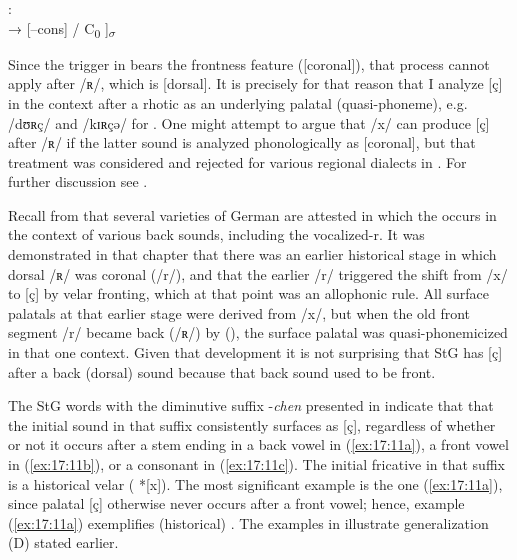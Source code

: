 \ea%
\label{ex:17:10}:\smallskip\\
 → [--cons] / {\longrule} C\textsubscript{0} ]\textsubscript{${\sigma}$}
\z 

Since the trigger  in  bears the frontness feature ([coronal]), that process cannot apply after /ʀ/, which is [dorsal]. It is precisely for that reason that I analyze [ç] in the context after a rhotic as an underlying palatal (quasi-phoneme), e.g. /dʊʀç/ and /kɪʀçə/ for . One might attempt to argue that /x/ can produce [ç] after /ʀ/ if the latter sound is analyzed phonologically as [coronal], but that treatment was considered and rejected for various regional dialects in . For further discussion see .

Recall from  that several varieties of German are attested in which the  occurs in the context of various back sounds, including the vocalized-r. It was demonstrated in that chapter that there was an earlier historical stage in which dorsal /ʀ/ was coronal (/r/), and that the earlier /r/ triggered the shift from /x/ to [ç] by velar fronting, which at that point was an allophonic rule. All surface palatals at that earlier stage were derived from /x/, but when the old front segment /r/ became back (/ʀ/) by  (), the surface palatal was quasi-phonemicized in that one context. Given that development it is not surprising that StG has [ç] after a back (dorsal) sound because that back sound used to be front.

The StG words with the diminutive suffix -\textit{chen} presented in  indicate that that the initial sound in that suffix consistently surfaces as [ç], regardless of whether or not it occurs after a stem ending in a back vowel in (\ref{ex:17:11a}), a front vowel in (\ref{ex:17:11b}), or a consonant in (\ref{ex:17:11c}). The initial fricative in that suffix is a historical velar ( *[x]). The most significant example is the one (\ref{ex:17:11a}), since palatal [ç] otherwise never occurs after a front vowel; hence, example (\ref{ex:17:11a}) exemplifies (historical)  . The examples in  illustrate generalization (D) stated earlier.


